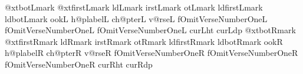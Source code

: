 \def\xdef@cseq#1#2{\x@\xdef\csname #1\endcsname{#2}}%
\def\def@cseq#1#2{\x@\def\csname #1\endcsname{#2}}%
\def\empty@cseq#1{\x@\xdef\csname #1\endcsname{}}%
\def\newsideSpecificIf#1{%
  \x@\def\csname #1true\endcsname{\x@\let\csname if#1\endcsname\iftrue}%
  \x@\def\csname #1false\endcsname{\x@\let\csname if#1\endcsname\iffalse}%
  \x@\def\csname #1default\endcsname{\x@\let\csname if#1\endcsname\undefined}%
}

\def\initcolumndef@ults#1{%
    \empty@cseq{n@xtbot#1mark}%
    \empty@cseq{n@xtfirst#1mark}%
    \empty@cseq{old#1mark}%
    \empty@cseq{first#1mark}%
    \empty@cseq{bot#1mark}%
    \empty@cseq{oldfirst#1mark}%
    \empty@cseq{oldbot#1mark}%
    \empty@cseq{book#1}%
    \empty@cseq{ch@plabel#1}%
    \empty@cseq{@ch@pter#1}%
    \empty@cseq{@v@rse#1}%
    \newsideSpecificIf{OmitVerseNumberOne#1} %
    \xdef@cseq{@cur#1ht}{0pt}%
    \xdef@cseq{@cur#1dp}{0pt}%
    \def@cseq{stylesheet#1}{\gdef\ds@ffix{#1}\stylesh@@t}%
    \x@\def\csname addTo#1Hooks\endcsname{\addToSideHooks{#1}}
}
\initcolumndef@ults{L}%
\initcolumndef@ults{R}%

\def\doVisTrace#1{%
  \setbox0=\vtop to 0pt{\hrule height 0pt depth 0.5pt width 15pt \hbox{\VisTracefont #1 \the\TRACEcount}\vss}\ht0=0pt \dp0=0pt
}
\def\doVisTraceT#1{%
  \setbox0=\vbox to 0pt{\vss\hbox{\VisTracefont #1 \the\TRACEcount}\hrule height 0pt depth 0.5pt width 15pt}\ht0=0pt \dp0=0pt
}

\diglotfalse%
\newif\ifdiglotSepNotes %
\diglotSepNotestrue%
\newif\ifdiglotBalNotes %
\diglotBalNotesfalse%
\newif\iftrialfailed
\global\def\n@xtc@mmand{}%

\newbox\n@xtpartialNrml %
\newbox\n@xtpartialRev %
\let\n@xtpartial=\n@xtpartialNrml


